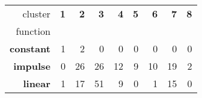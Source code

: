 \begin{tabular}{r|rrrrrrrr}
cluster & \textbf{1} & \textbf{2} & \textbf{3} & \textbf{4} & \textbf{5} & \textbf{6} & \textbf{7} & \textbf{8} \\
function &  &  &  &  &  &  &  &  \\
\hline
\textbf{constant} & {\cellcolor[HTML]{73A9CF}} \color[HTML]{F1F1F1} 1 & {\cellcolor[HTML]{023858}} \color[HTML]{F1F1F1} 2 & {\cellcolor[HTML]{FFF7FB}} \color[HTML]{000000} 0 & {\cellcolor[HTML]{FFF7FB}} \color[HTML]{000000} 0 & {\cellcolor[HTML]{FFF7FB}} \color[HTML]{000000} 0 & {\cellcolor[HTML]{FFF7FB}} \color[HTML]{000000} 0 & {\cellcolor[HTML]{FFF7FB}} \color[HTML]{000000} 0 & {\cellcolor[HTML]{FFF7FB}} \color[HTML]{000000} 0 \\
\textbf{impulse} & {\cellcolor[HTML]{FFF7FB}} \color[HTML]{000000} 0 & {\cellcolor[HTML]{023858}} \color[HTML]{F1F1F1} 26 & {\cellcolor[HTML]{023858}} \color[HTML]{F1F1F1} 26 & {\cellcolor[HTML]{83AFD3}} \color[HTML]{F1F1F1} 12 & {\cellcolor[HTML]{B0C2DE}} \color[HTML]{000000} 9 & {\cellcolor[HTML]{A2BCDA}} \color[HTML]{000000} 10 & {\cellcolor[HTML]{0C74B2}} \color[HTML]{F1F1F1} 19 & {\cellcolor[HTML]{F4EDF6}} \color[HTML]{000000} 2 \\
\textbf{linear} & {\cellcolor[HTML]{FCF4FA}} \color[HTML]{000000} 1 & {\cellcolor[HTML]{B4C4DF}} \color[HTML]{000000} 17 & {\cellcolor[HTML]{023858}} \color[HTML]{F1F1F1} 51 & {\cellcolor[HTML]{E0DEED}} \color[HTML]{000000} 9 & {\cellcolor[HTML]{FFF7FB}} \color[HTML]{000000} 0 & {\cellcolor[HTML]{FCF4FA}} \color[HTML]{000000} 1 & {\cellcolor[HTML]{C1CAE2}} \color[HTML]{000000} 15 & {\cellcolor[HTML]{FFF7FB}} \color[HTML]{000000} 0 \\
\end{tabular}
